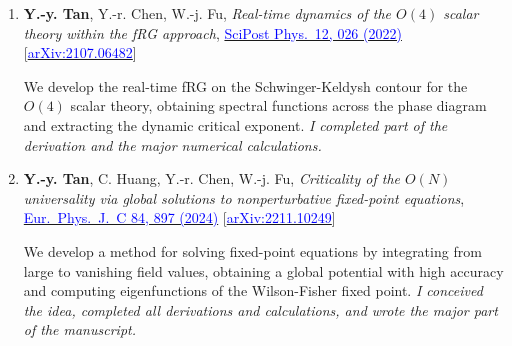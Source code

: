 \documentclass[11pt,a4paper]{article}
\begin{document}
\begin{enumerate}[leftmargin=*, label=\textbf{\arabic*.}, itemsep=6pt]
\item \textbf{Y.-y. Tan}, Y.-r. Chen, W.-j. Fu, \textit{Real-time dynamics of the $O(4)$ scalar theory within the fRG approach}, \href{https://doi.org/10.21468/SciPostPhys.12.1.026}{\textcolor{blue}{SciPost Phys.~12, 026 (2022)}} [\href{https://arxiv.org/abs/2107.06482}{\textcolor{blue}{arXiv:2107.06482}}]

We develop the real-time fRG on the Schwinger-Keldysh contour for the $O(4)$ scalar theory, obtaining spectral functions across the phase diagram and extracting the dynamic critical exponent. \textit{I completed part of the derivation and the major numerical calculations.}

\item \textbf{Y.-y. Tan}, C. Huang, Y.-r. Chen, W.-j. Fu, \textit{Criticality of the $O(N)$ universality via global solutions to nonperturbative fixed-point equations}, \href{https://doi.org/10.1140/epjc/s10052-024-13291-7}{\textcolor{blue}{Eur.~Phys.~J.~C 84, 897 (2024)}} [\href{https://arxiv.org/abs/2211.10249}{\textcolor{blue}{arXiv:2211.10249}}]

We develop a method for solving fixed-point equations by integrating from large to vanishing field values, obtaining a global potential with high accuracy and computing eigenfunctions of the Wilson-Fisher fixed point. \textit{I conceived the idea, completed all derivations and calculations, and wrote the major part of the manuscript.}

\end{enumerate}
\end{document}
